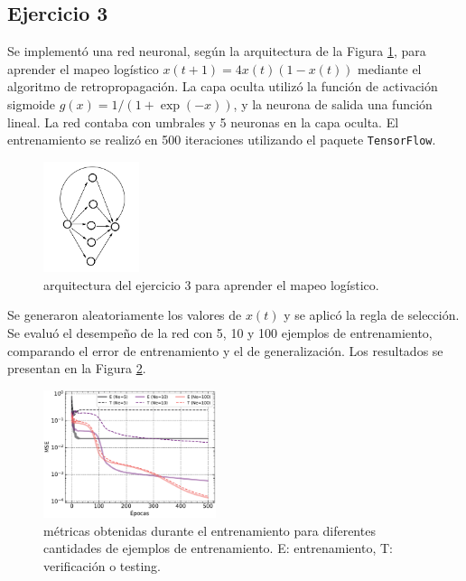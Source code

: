 \documentclass[11pt, twocolumn]{article}
\begin{document}
\subsection*{Ejercicio 3}
Se implementó una red neuronal, según la arquitectura de la Figura \ref{fig:arquitectura_e3}, para aprender el mapeo logístico \(x(t+1) = 4 x(t) (1 - x(t))\) mediante el algoritmo de retropropagación. La capa oculta utilizó la función de activación sigmoide \(g(x) = 1 / (1 + \exp(-x))\), y la neurona de salida una función lineal. La red contaba con umbrales y 5 neuronas en la capa oculta. El entrenamiento se realizó en 500 iteraciones utilizando el paquete \texttt{TensorFlow}.

\begin{figure} [htbp]
  \centering
  \includegraphics[width=0.25\textwidth]{figures/arquitectura_e3.png}
  \caption{arquitectura del ejercicio 3 para aprender el mapeo logístico.}
  \label{fig:arquitectura_e3}
\end{figure}

Se generaron aleatoriamente los valores de \(x(t)\) y se aplicó la regla de selección. Se evaluó el desempeño de la red con 5, 10 y 100 ejemplos de entrenamiento, comparando el error de entrenamiento y el de generalización. Los resultados se presentan en la Figura \ref{fig:metrics_e3}.

\begin{figure}
  \centering
  \includegraphics[width=0.45\textwidth]{figures/metrics_e3.pdf}
  \caption{métricas obtenidas durante el entrenamiento para diferentes cantidades de ejemplos de entrenamiento. E: entrenamiento, T: verificación o testing.}
  \label{fig:metrics_e3}
\end{figure}
\end{document}
